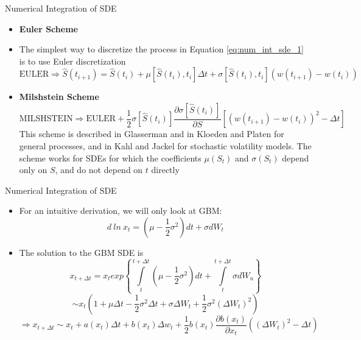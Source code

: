 \documentclass[11pt]{beamer}
\begin{document}
\begin{frame}{Numerical Integration of SDE}
\begin{itemize}
\item \textbf{Euler Scheme}
\item The simplest way to discretize the process in Equation \eqref{eq:num_int_sde_1} is to use Euler discretization
$$ \text{EULER} \Rightarrow \hat S(t_{i+1}) = \hat S(t_i) + \mu[\hat S(t_i), t_i]
\Delta t + \sigma[\hat S(t_i), t_i ] \left( w(t_{i+1}) - w(t_i) \right) $$
\item \textbf{Milshstein Scheme}
$$\text{MILSHSTEIN} \Rightarrow \text{EULER} + \frac{1}{2} \sigma[\hat S(t_i)] 
\frac{\partial \sigma[\hat S(t_i)]}{\partial S} 
\left[ \left( w(t_{i+1}) - w(t_i) \right)^2 - \Delta t  \right]$$
\footnotesize
This scheme is described in Glasserman and in Kloeden and Platen for
general processes, and in Kahl and Jackel for stochastic volatility models.
The scheme works for SDEs for which the coefficients $\mu (S_t)$ and $\sigma(S_t)$ depend
only on $S$, and do not depend on $t$ directly
\normalsize
\end{itemize}
\end{frame}
\begin{frame}{Numerical Integration of SDE	}
\begin{itemize}
\item For an intuitive derivation, we will only look at GBM:
$$d\> ln \> x_t = \left( \mu -\frac{1}{2}\sigma^2 \right) dt + \sigma dW_t$$
\item The solution to the GBM SDE is
$$x_{t+\Delta t} = x_t exp \left\lbrace
\int\limits_{t}^{t+\Delta t}
\left( \mu -\frac{1}{2}\sigma^2 \right)dt
+
\int\limits_{t}^{t+\Delta t}
\sigma dW_u
\right\rbrace
$$
$$
\sim x_t \left(
1+\mu\Delta t - \frac{1}{2}\sigma^2 \Delta t + \sigma \Delta W_t + \frac{1}{2}\sigma^2 (\Delta W_t)^2
\right)
$$
$$
\Rightarrow x_{t+\Delta t} \sim x_t + a(x_t)\Delta t + b(x_t) \Delta w_t + \frac{1}{2}b(x_t) \frac{\partial b(x_t)}{\partial x_t}((\Delta W_t)^2 - \Delta t)
$$
\end{itemize}
\end{frame}
\end{document}
